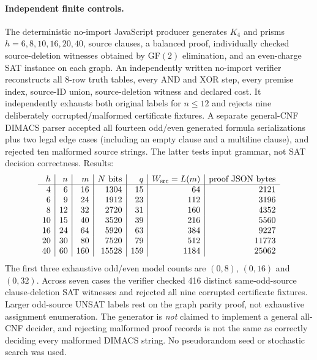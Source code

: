 \documentclass[11pt]{article}
\begin{document}
\paragraph{Independent finite controls.}
The deterministic no-import JavaScript producer generates $K_4$ and prisms $h=6,8,10,16,20,40$, source clauses, a balanced proof, individually checked source-deletion witnesses obtained by GF$(2)$ elimination, and an even-charge SAT instance on each graph. An independently written no-import verifier reconstructs all 8-row truth tables, every AND and XOR step, every premise index, source-ID union, source-deletion witness and declared cost. It independently exhausts both original labels for $n\le12$ and rejects nine deliberately corrupted/malformed certificate fixtures. A separate general-CNF DIMACS parser accepted all fourteen odd/even generated formula serializations plus two legal edge cases (including an empty clause and a multiline clause), and rejected ten malformed source strings. The latter tests input grammar, not SAT decision correctness. Results:
\[
\begin{array}{r|r|r|r|r|r|r}
h&n&m&N\text{ bits}&q&W_{\rm src}=L(m)&\text{proof JSON bytes}\\\hline
4&6&16&1304&15&64&2121\\
6&9&24&1912&23&112&3196\\
8&12&32&2720&31&160&4352\\
10&15&40&3520&39&216&5560\\
16&24&64&5920&63&384&9227\\
20&30&80&7520&79&512&11773\\
40&60&160&15528&159&1184&25062
\end{array}
\]
The first three exhaustive odd/even model counts are $(0,8)$, $(0,16)$ and $(0,32)$. Across seven cases the verifier checked 416 distinct same-odd-source clause-deletion SAT witnesses and rejected all nine corrupted certificate fixtures. Larger odd-source UNSAT labels rest on the graph parity proof, not exhaustive assignment enumeration. The generator is \emph{not} claimed to implement a general all-CNF decider, and rejecting malformed proof records is not the same as correctly deciding every malformed DIMACS string. No pseudorandom seed or stochastic search was used.
\end{document}
